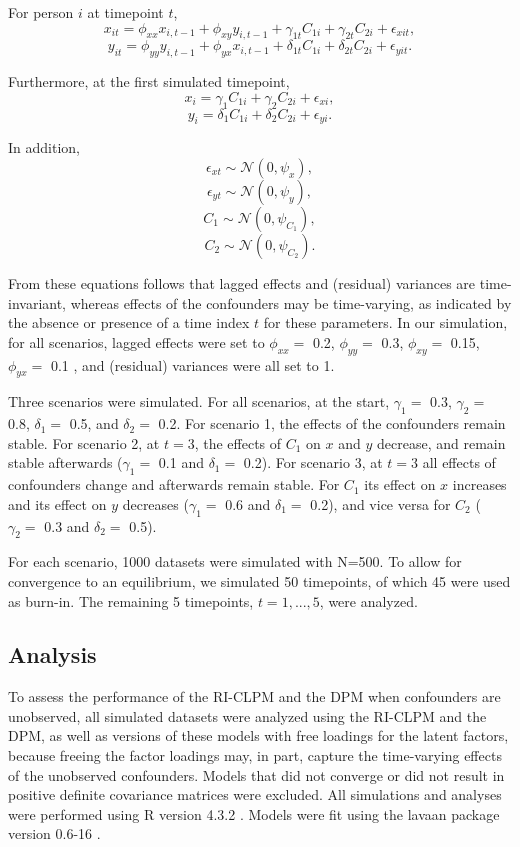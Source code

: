 \documentclass[
  a4paper,
  stu,
  floatsintext,
  donotrepeattitle]{apa7}
\begin{document}
For person \(i\) at timepoint \(t\), \[
x_{it} = \phi_{xx}x_{i,t-1} + \phi_{xy}y_{i,t-1} + \gamma_{1t}C_{1i} + \gamma_{2t}C_{2i} + \epsilon_{xit},
\] \[
y_{it} = \phi_{yy}y_{i,t-1} + \phi_{yx}x_{i,t-1} + \delta_{1t}C_{1i} + \delta_{2t}C_{2i} + \epsilon_{yit}.
\]

Furthermore, at the first simulated timepoint, \[
x_{i} = \gamma_{1}C_{1i} + \gamma_{2}C_{2i} + \epsilon_{xi},
\] \[
y_{i} = \delta_{1}C_{1i} + \delta_{2}C_{2i} + \epsilon_{yi}.
\]

In addition, \[
\epsilon_{xt} \sim \mathcal{N}(0, \psi_x),
\] \[
\epsilon_{yt} \sim \mathcal{N}(0, \psi_y),
\] \[
C_{1} \sim \mathcal{N}(0, \psi_{C_1}),
\] \[
C_{2} \sim \mathcal{N}(0, \psi_{C_2}).
\]

From these equations follows that lagged effects and (residual)
variances are time-invariant, whereas effects of the confounders may be
time-varying, as indicated by the absence or presence of a time index
\(t\) for these parameters. In our simulation, for all scenarios, lagged
effects were set to \(\phi_{xx} =\) 0.2, \(\phi_{yy} =\) 0.3,
\(\phi_{xy} =\) 0.15, \(\phi_{yx} =\) 0.1 \autocite[based
on][]{mulder2023}, and (residual) variances were all set to 1.

Three scenarios were simulated. For all scenarios, at the start,
\(\gamma_{1} =\) 0.3, \(\gamma_{2} =\) 0.8, \(\delta_{1} =\) 0.5, and
\(\delta_{2} =\) 0.2. For scenario 1, the effects of the confounders
remain stable. For scenario 2, at \(t=3\), the effects of \(C_1\) on
\(x\) and \(y\) decrease, and remain stable afterwards (\(\gamma_{1} =\)
0.1 and \(\delta_{1} =\) 0.2). For scenario 3, at \(t=3\) all effects of
confounders change and afterwards remain stable. For \(C_1\) its effect
on \(x\) increases and its effect on \(y\) decreases (\(\gamma_{1} =\)
0.6 and \(\delta_{1} =\) 0.2), and vice versa for \(C_2\)
(\(\gamma_{2} =\) 0.3 and \(\delta_{2} =\) 0.5).

For each scenario, 1000 datasets were simulated with N=500. To allow for
convergence to an equilibrium, we simulated 50 timepoints, of which 45
were used as burn-in. The remaining 5 timepoints, \(t=1,...,5\), were
analyzed.

\hypertarget{analysis}{%
\subsection{Analysis}\label{analysis}}

To assess the performance of the RI-CLPM and the DPM when confounders
are unobserved, all simulated datasets were analyzed using the RI-CLPM
and the DPM, as well as versions of these models with free loadings for
the latent factors, because freeing the factor loadings may, in part,
capture the time-varying effects of the unobserved confounders. Models
that did not converge or did not result in positive definite covariance
matrices were excluded. All simulations and analyses were performed
using R version 4.3.2 \autocite{R}. Models were fit using the lavaan
package version 0.6-16 \autocite{lavaan}.
\end{document}
